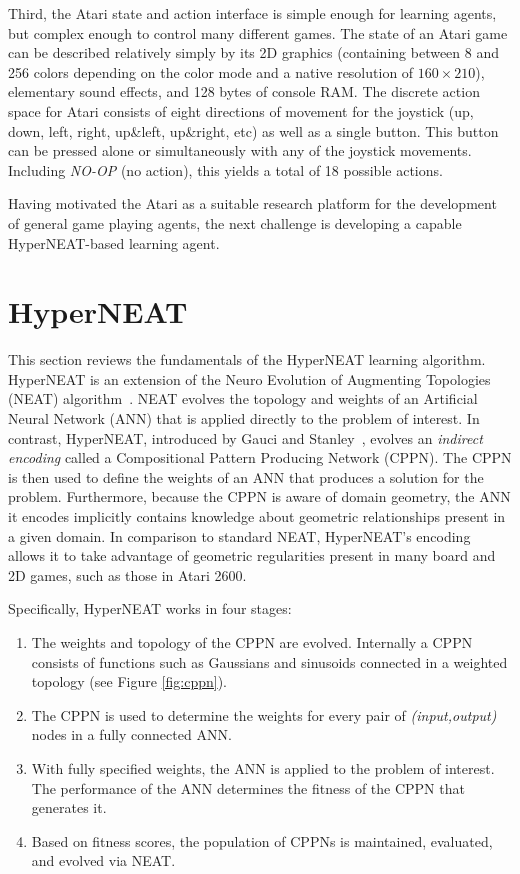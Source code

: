 \documentclass{sig-alternate}
\begin{document}
Third, the Atari state and action interface is simple enough for learning agents, but complex enough to control many different games. The state of an Atari game can be described relatively simply by its 2D graphics (containing between 8 and 256 colors depending on the color mode and a native resolution of $160\times 210$), elementary sound effects, and 128 bytes of console RAM. The discrete action space for Atari consists of eight directions of movement for the joystick (up, down, left, right, up\&left, up\&right, etc) as well as a single button. This button can be pressed alone or simultaneously with any of the joystick movements. Including \textit{NO-OP} (no action), this yields a total of 18 possible actions.

Having motivated the Atari as a suitable research platform for the development of general game playing agents, the next challenge is developing a capable HyperNEAT-based learning agent.

\section{HyperNEAT}
\label{sec:hyperneat}
This section reviews the fundamentals of the HyperNEAT learning algorithm. HyperNEAT is an extension of the Neuro Evolution of Augmenting Topologies (NEAT) algorithm~\cite{stanley02}. NEAT evolves the topology and weights of an Artificial Neural Network (ANN) that is applied directly to the problem of interest. In contrast, HyperNEAT, introduced by Gauci and Stanley~\cite{gauci08}, evolves an \emph{indirect encoding} called a Compositional Pattern Producing Network (CPPN). The CPPN is then used to define the weights of an ANN that produces a solution for the problem. Furthermore, because the CPPN is aware of domain geometry, the ANN it encodes implicitly contains knowledge about geometric relationships present in a given domain. In comparison to standard NEAT, HyperNEAT's encoding allows it to take advantage of geometric regularities present in many board and 2D games, such as those in Atari 2600. 

Specifically, HyperNEAT works in four stages:

\begin{enumerate}
\item The weights and topology of the CPPN are evolved. Internally a CPPN consists of functions such as Gaussians and sinusoids connected in a weighted topology (see Figure \ref{fig:cppn}).
\item The CPPN is used to determine the weights for every pair of \emph{(input,output)} nodes in a fully connected ANN.
\item With fully specified weights, the ANN is applied to the problem of interest. The performance of the ANN determines the fitness of the CPPN that generates it.
\item Based on fitness scores, the population of CPPNs is maintained, evaluated, and evolved via NEAT.
\end{enumerate}
\end{document}
